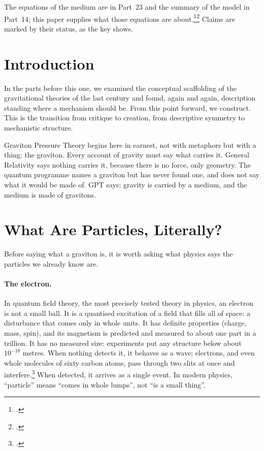 \documentclass[11pt,a4paper]{article}
\newcommand{\fn}[1]{\footnote{\citealp{#1}.}}
\begin{document}
The equations of the medium are in Part~23 and the summary of the model in Part~14; this paper supplies what those equations are about.\fn{rashadaPart23}\fn{rashadaPart14} Claims are marked by their status, as the key shows.

\statuskey

\section*{Introduction}

In the parts before this one, we examined the conceptual scaffolding of the gravitational theories of the last century and found, again and again, description standing where a mechanism should be. From this point forward, we construct. This is the transition from critique to creation, from descriptive symmetry to mechanistic structure.

Graviton Pressure Theory begins here in earnest, not with metaphors but with a thing: the graviton. Every account of gravity must say what carries it. General Relativity says nothing carries it, because there is no force, only geometry. The quantum programme names a graviton but has never found one, and does not say what it would be made of. GPT says: gravity is carried by a medium, and the medium is made of gravitons.

\section{What Are Particles, Literally?}
\label{sec:particles}

Before saying what a graviton is, it is worth asking what physics says the particles we already know are.

\paragraph{The electron.} In quantum field theory, the most precisely tested theory in physics, an electron is not a small ball. It is a quantised excitation of a field that fills all of space: a disturbance that comes only in whole units. It has definite properties (charge, mass, spin), and its magnetism is predicted and measured to about one part in a trillion. It has no measured size: experiments put any structure below about $10^{-18}$ metres. When nothing detects it, it behaves as a wave; electrons, and even whole molecules of sixty carbon atoms, pass through two slits at once and interfere.\fn{arndt1999} When detected, it arrives as a single event. In modern physics, ``particle'' means ``comes in whole lumps'', not ``is a small thing''.
\end{document}
